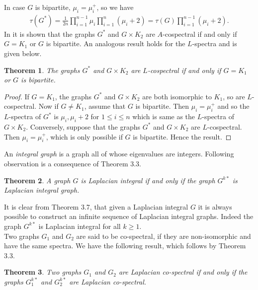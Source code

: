 \documentclass[12pt,a4paper]{amsart}
\newtheorem{theorem}{Theorem}[section]
\theoremstyle{theorem}
\theoremstyle{definition}
\numberwithin{equation}{section} \makeatletter
\begin{document}
\indent In case $G$ is bipartite, $\mu_i=\mu_i^+$, so we have
\begin{align*}
\tau(G^*)=\frac{1}{2n}\prod\limits_{i=1}^{n-1}\mu_i\prod\limits_{i=1}^{n}(\mu_i+2)=\tau(G)\prod\limits_{i=1}^{n-1}(\mu_i+2).
\end{align*}
\indent In \cite{c} it is shown that the graphs $G^*$ and $G\times K_2$ are $A$-cospectral if and only if $G=K_1$ or $G$ is bipartite. An analogous result holds for the $L$-spectra and is given below.
\begin{theorem}
The graphs $G^*$ and $G\times K_2$ are $L$-cospectral if and only if $G=K_1$ or $G$ is bipartite.
\end{theorem}
\begin{proof}
If $G=K_1$, the graphs $G^*$ and $G\times K_2$ are both isomorphic to $K_1$, so are $L$-cospectral. Now if $G\neq K_1$, assume that $G$ is bipartite. Then $\mu_i=\mu_i^+$ and so the $L$-spectra of $G^*$ is $\mu_i, \mu_i+2$ for $1\leq i\leq n$ which is same as the $L$-spectra of $G\times K_2$. Conversely, suppose that the graphs $G^*$ and $G\times K_2$ are $L$-cospectral. Then $\mu_i=\mu_i^+$, which is only possible if $G$ is bipartite. Hence the result.
\end{proof}
\indent An {\it integral graph} is a graph all of whose eigenvalues are integers. Following observation is a consequence of Theorem 3.3.
\begin{theorem}
A graph $G$ is {\it Laplacian integral} if and only if the graph $G^{k*}$ is Laplacian integral graph.
\end{theorem}
\indent It is clear from Theorem 3.7, that given a Laplacian integral $G$ it is always possible to construct an infinite sequence of Laplacian integral graphs. Indeed the graph $G^{k*}$ is Laplacian integral for all $k\geq 1$.\\
\indent Two graphs $G_1$ and $G_2$  are said to be co-spectral, if they are non-isomorphic and have the same spectra. We have the following result, which follows by Theorem 3.3.
\begin{theorem}
Two graphs $G_1$ and $G_2$ are Laplacian co-spectral if and only if the graphs $G_1^{k*}$ and $G_2^{k*}$ are Laplacian co-spectral.
\end{theorem}
\end{document}
